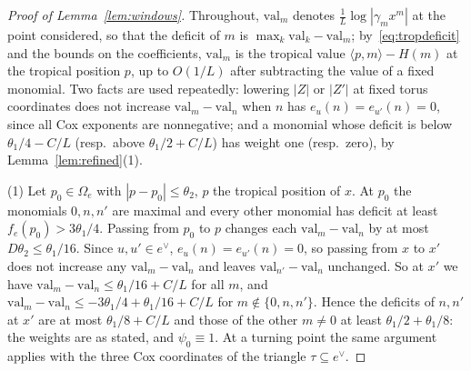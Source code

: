 \begin{proof}[Proof of Lemma~\ref{lem:windows}]
Throughout, $\mathrm{val}_m$ denotes $\frac1L\log|\gamma_mx^m|$ at the point considered, so that the deficit of $m$ is
$\max_k\mathrm{val}_k-\mathrm{val}_m$; by~\eqref{eq:tropdeficit} and the bounds on the coefficients, $\mathrm{val}_m$ is the
tropical value $\langle p,m\rangle-H(m)$ at the tropical position $p$, up to $O(1/L)$ after subtracting the value of a
fixed monomial. Two facts are used repeatedly: lowering $|Z|$ or $|Z'|$ at fixed torus coordinates does not increase
$\mathrm{val}_m-\mathrm{val}_n$ when $n$ has $e_u(n)=e_{u'}(n)=0$, since all Cox exponents are nonnegative; and a monomial
whose deficit is below $\theta_1/4-C/L$ (resp.\ above $\theta_1/2+C/L$) has weight one (resp.\ zero), by
Lemma~\ref{lem:refined}(1).

(1) Let $p_0\in\Omega_e$ with $|p-p_0|\le\theta_2$, $p$ the tropical position of $x$. At $p_0$ the monomials $0,n,n'$ are
maximal and every other monomial has deficit at least $f_e(p_0)>3\theta_1/4$. Passing from $p_0$ to $p$ changes each
$\mathrm{val}_m-\mathrm{val}_n$ by at most $D\theta_2\le\theta_1/16$. Since $u,u'\in e^\vee$, $e_u(n)=e_{u'}(n)=0$, so passing
from $x$ to $x'$ does not increase any $\mathrm{val}_m-\mathrm{val}_n$ and leaves $\mathrm{val}_{n'}-\mathrm{val}_n$ unchanged. So at $x'$
we have $\mathrm{val}_m-\mathrm{val}_n\le\theta_1/16+C/L$ for all $m$, and
$\mathrm{val}_m-\mathrm{val}_n\le-3\theta_1/4+\theta_1/16+C/L$ for $m\notin\{0,n,n'\}$. Hence the deficits of $n,n'$ at $x'$ are at
most $\theta_1/8+C/L$ and those of the other $m\ne0$ at least $\theta_1/2+\theta_1/8$: the weights are as stated, and
$\psi_0\equiv1$. At a turning point the same argument applies with the three Cox coordinates of the triangle
$\tau\subseteq e^\vee$.


\end{proof}
